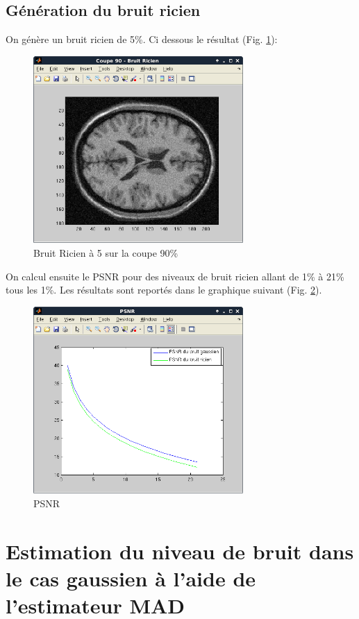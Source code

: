 \documentclass{report}
\begin{document}
\subsection{Génération du bruit ricien}

On génère un bruit ricien de 5\%. Ci dessous le résultat (Fig. \ref{fig:ricien}):

\begin{figure}[ht!]
	\centering
	\includegraphics[width = 8cm]{coupe90Rici.png}
	\caption{\label{fig:ricien}Bruit Ricien à 5 sur la coupe 90\%}
	
\end{figure}

On calcul ensuite le PSNR pour des niveaux de bruit ricien allant de 1\% à 21\% tous les 1\%. Les résultats sont reportés dans le graphique suivant (Fig. \ref{fig:psnr}).
\begin{figure}[ht!]
	\centering
	\includegraphics[width = 8cm]{PSNR.png}
	\caption{\label{fig:psnr}PSNR}
	
\end{figure}

\section{Estimation du niveau de bruit dans le cas gaussien à l'aide de l'estimateur MAD}
\end{document}
